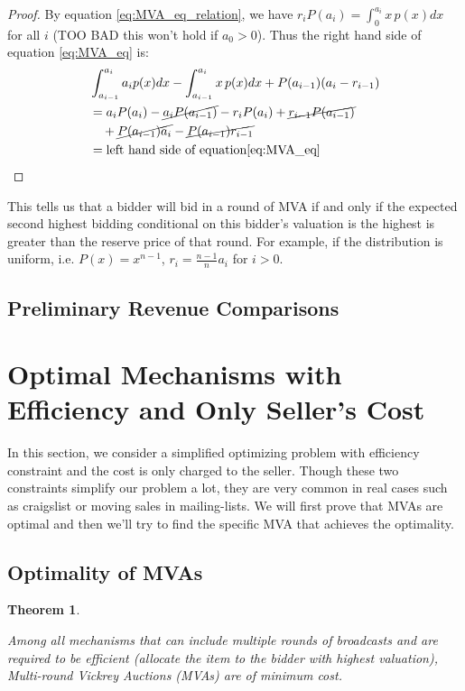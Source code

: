 \documentclass{aamas2012}
\newtheorem{theorem}{Theorem}
\begin{document}
\begin{proof}
By equation \ref{eq:MVA_eq_relation}, we have $r_i P(a_i) = \int_{0}^{a_i}
x\,p(x)dx$ for all $i$ (TOO BAD this won't hold if $a_0 > 0$). Thus the right
hand side of equation \ref{eq:MVA_eq} is:
\begin{align*}
	& \int_{a_{i-1}}^{a_i} a_i p(x) dx - \int_{a_{i-1}}^{a_i} x \, p(x) dx + P(a_{i-1})(a_i-r_{i-1}) \\
	&= a_i P(a_i) - \cancel{a_i P(a_{i-1})} - r_i P(a_i) + \cancel{r_{i-1} P(a_{i-1})} \\
		& ~~~ + \cancel{P(a_{i-1}) a_i} - \cancel{P(a_{i-1}) r_{i-1}}\\
	&= \mbox{left hand side of equation\ref{eq:MVA_eq}}
\end{align*}
\end{proof}

This tells us that a bidder will bid in a round of MVA if and only if the
expected second highest bidding conditional on this bidder's valuation is the
highest is greater than the reserve price of that round. For example, if the
distribution is uniform, i.e. $P(x) = x^{n-1}$, $r_i = \frac{n-1}{n} a_i$ for
$i > 0$.



\subsection{Preliminary Revenue Comparisons}

\section{Optimal Mechanisms with Efficiency and Only Seller's Cost}

In this section, we consider a simplified optimizing problem with efficiency
constraint and the cost is only charged to the seller.  Though these two
constraints simplify our problem a lot, they are very common in real cases such
as craigslist or moving sales in mailing-lists.  We will first prove that MVAs
are optimal and then we'll try to find the specific MVA that achieves the
optimality.

\subsection{Optimality of MVAs}

\begin{theorem}\label{theorem1}

Among all mechanisms that can include multiple rounds of broadcasts and are
required to be efficient (allocate the item to the bidder with highest
valuation), Multi-round Vickrey Auctions (MVAs) are of minimum cost.

\end{theorem}
\end{document}
